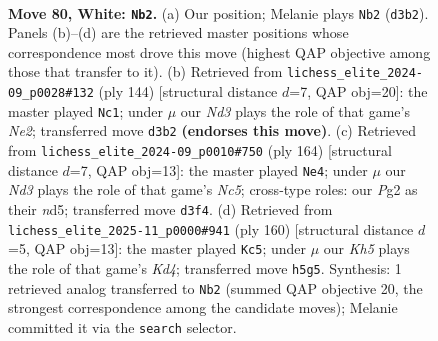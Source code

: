 \documentclass[11pt]{article}
\begin{document}
\clearpage

\begin{figure}[p]\centering
\begin{subfigure}{0.46\textwidth}\centering
\resizebox{\linewidth}{!}{%
\newchessgame
\chessboard[
  setfen={8/8/k7/7K/8/1R1N4/6P1/3r4 w - - 24 80},
  showmover=false,
  pgfstyle=straightmove, color=movearrow, markmove={d3-b2}
]}
\caption{}
\end{subfigure}\hfill
\begin{subfigure}{0.46\textwidth}\centering
\resizebox{\linewidth}{!}{%
\newchessgame
\chessboard[
  setfen={8/8/7p/4K3/6k1/8/4N1r1/4R3 w - - 2 73},
  showmover=false,
  pgfstyle=straightmove, color=movearrow, markmove={e2-c1}
]}
\caption{}
\end{subfigure}
\\[4pt]
\begin{subfigure}{0.46\textwidth}\centering
\resizebox{\linewidth}{!}{%
\newchessgame
\chessboard[
  setfen={2R5/6k1/8/1rNn4/8/5PK1/8/8 w - - 35 83},
  showmover=false,
  pgfstyle=straightmove, color=movearrow, markmove={c5-e4}
]}
\caption{}
\end{subfigure}\hfill
\begin{subfigure}{0.46\textwidth}\centering
\resizebox{\linewidth}{!}{%
\newchessgame
\chessboard[
  setfen={8/8/8/5k2/3K4/R1N5/2r5/8 w - - 3 81},
  showmover=false,
  pgfstyle=straightmove, color=movearrow, markmove={d4-c5}
]}
\caption{}
\end{subfigure}
\caption{\textbf{Move 80, White: \texttt{Nb2}.} (a) Our position; Melanie plays \texttt{Nb2} (\texttt{d3b2}). Panels (b)--(d) are the retrieved master positions whose correspondence most drove this move (highest QAP objective among those that transfer to it). (b) Retrieved from \texttt{lichess\_elite\_2024-09\_p0028\#132} (ply 144) [structural distance $d$=7, QAP obj=20]: the master played \texttt{Nc1}; under $\mu$ our \emph{Nd3} plays the role of that game's \emph{Ne2}; transferred move \texttt{d3b2} \textbf{(endorses this move)}. (c) Retrieved from \texttt{lichess\_elite\_2024-09\_p0010\#750} (ply 164) [structural distance $d$=7, QAP obj=13]: the master played \texttt{Ne4}; under $\mu$ our \emph{Nd3} plays the role of that game's \emph{Nc5}; cross-type roles: our \emph{P}g2 as their \emph{n}d5; transferred move \texttt{d3f4}. (d) Retrieved from \texttt{lichess\_elite\_2025-11\_p0000\#941} (ply 160) [structural distance $d$=5, QAP obj=13]: the master played \texttt{Kc5}; under $\mu$ our \emph{Kh5} plays the role of that game's \emph{Kd4}; transferred move \texttt{h5g5}. Synthesis: 1 retrieved analog transferred to \texttt{Nb2} (summed QAP objective 20, the strongest correspondence among the candidate moves); Melanie committed it via the \texttt{search} selector.}
\label{fig:thought-m158}
\end{figure}
\end{document}
